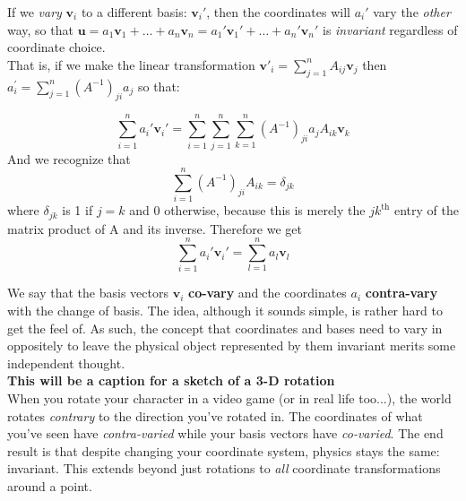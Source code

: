 	If we \emph{vary} $\mathbf v_i$ to a different basis: $\mathbf v_i'$, then the coordinates will $a_i'$ vary the \emph{other} way, so that $\mathbf u = a_1 \mathbf v_1 + \dots + a_n \mathbf v_n = a_1' \mathbf v_1' + \dots + a_n' \mathbf v_n'$ is \emph{invariant} regardless of coordinate choice.\\
	
	That is, if we make the linear transformation $\mathbf v'_i = \sum_{j=1}^n A_{ij} \mathbf v_j$ then $a^\prime_i = \sum_{j=1}^n (A^{-1})_{ji} a_j$ so that:
	
	\begin{equation*}
		\sum_{i=1}^n a_i' \mathbf v_i' = \sum_{i=1}^n \sum_{j=1}^n\sum_{k=1}^n (A^{-1})_{ji} a_jA_{ik}\mathbf v_k
	\end{equation*}
	And we recognize that 
	\begin{equation*}
		\sum\limits_{i = 1}^n (A^{-1})_{ji} A_{ik} = \delta_{jk}
	\end{equation*}
	where $\delta_{jk}$ is 1 if $j = k$ and 0 otherwise, because this is merely the $jk^{\text{th}}$ entry of the matrix product of A and its inverse.  Therefore we get 
	\begin{equation*}
		\sum_{i=1}^n a_i' \mathbf v_i' =   \sum_{l=1}^n  a_l\mathbf v_l
	\end{equation*}
	 
We say that the basis vectors $\mathbf v_i$ \textbf{co-vary} and the coordinates $a_i$ \textbf{contra-vary} with the change of basis. The idea, although it sounds simple, is rather hard to get the feel of. As such, the concept that coordinates and bases need to vary in oppositely to leave the physical object represented by them invariant merits some independent thought.\\ 
	
	\textbf{This will be a caption for a sketch of a 3-D rotation}\\
	
	 When you rotate your character in a video game (or in real life too...), the world rotates \emph{contrary} to the direction you've rotated in. The coordinates of what you've seen have \emph{contra-varied} while your basis vectors have \emph{co-varied}. The end result is that despite changing your coordinate system, physics stays the same: invariant. This extends beyond just rotations to \emph{all} coordinate transformations around a point. 
	
	

